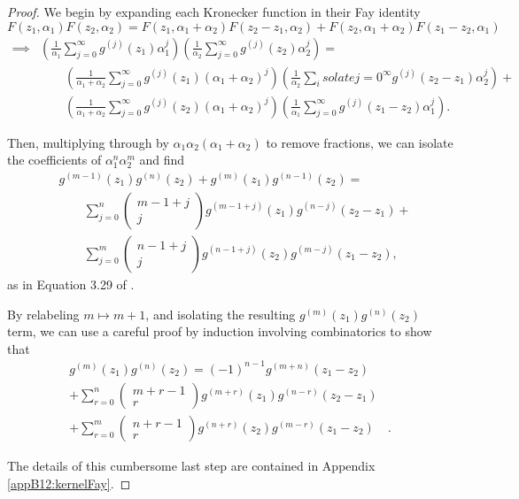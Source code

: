 \begin{proof}
    We begin by expanding each Kronecker function in their Fay identity
    \begin{equation}
        {F}(z_1,\alpha_1){F}(z_2,\alpha_2) = {F}(z_1,\alpha_1+\alpha_2){F}(z_2-z_1,\alpha_2) + {F}(z_2,\alpha_1+\alpha_2){F}(z_1-z_2,\alpha_1)
    \end{equation}
    \begin{align}
        \implies & \left(\frac{1}{\alpha_1} \sum_{j=0}^{\infty} g^{(j)}(z_1) \alpha_1^j\right)
        \left(\frac{1}{\alpha_2} \sum_{j=0}^{\infty} g^{(j)}(z_2) \alpha_2^j\right) =
        \\ & \quad \quad \left(\frac{1}{\alpha_1+\alpha_2} \sum_{j=0}^{\infty} g^{(j)}(z_1) (\alpha_1+\alpha_2)^j\right)
        \left(\frac{1}{\alpha_2} \sum_isolate {j=0}^{\infty} g^{(j)}(z_2-z_1) \alpha_2^j\right) +
        \\ & \quad \quad \left(\frac{1}{\alpha_1+\alpha_2} \sum_{j=0}^{\infty} g^{(j)}(z_2) (\alpha_1+\alpha_2)^j\right)
        \left(\frac{1}{\alpha_1} \sum_{j=0}^{\infty} g^{(j)}(z_1-z_2) \alpha_1^j\right).
    \end{align}

    Then, multiplying through by $\alpha_1\alpha_2(\alpha_1+\alpha_2)$ to remove fractions, we can isolate the coefficients of $\alpha_1^n \alpha_2^m$ and find
    \begin{align}\label{eqnB12:kernelFaySTART}
        & g^{(m-1)}(z_1)g^{(n)}(z_2)+g^{(m)}(z_1)g^{(n-1)}(z_2) =
        \\ & \quad \quad \sum_{j=0}^{n} \begin{pmatrix} m-1+j \\ j \end{pmatrix} g^{(m-1+j)}(z_1) g^{(n-j)}(z_2-z_1) +
        \\ & \quad \quad \sum_{j=0}^{m} \begin{pmatrix} n-1+j \\ j \end{pmatrix} g^{(n-1+j)}(z_2) g^{(m-j)}(z_1-z_2),
    \end{align}
    as in Equation 3.29 of \cite{Broedel_2015}.

    By relabeling $m \mapsto m+1$, and isolating the resulting $g^{(m)}(z_1)g^{(n)}(z_2)$ term, we can use a careful proof by induction involving combinatorics to show that
    \begin{align}\label{eqnB12:kernelFayEND}
        g^{(m)}(z_1) g^{(n)}(z_2) = (-1)^{n-1} g^{(m+n)}(z_1-z_2) &   \\
         +\sum_{r=0}^n \begin{pmatrix} m+r-1 \\ r \end{pmatrix} g^{(m+r)}(z_1) g^{(n-r)}(z_2-z_1) & \\
         +\sum_{r=0}^m \begin{pmatrix} n+r-1 \\ r \end{pmatrix} g^{(n+r)}(z_2) g^{(m-r)}(z_1-z_2) & .
    \end{align}

    The details of this cumbersome last step are contained in Appendix \ref{appB12:kernelFay}.
\end{proof}

